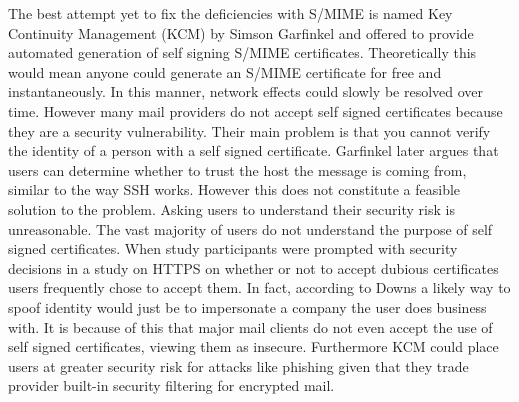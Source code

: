 \documentclass[11pt]{article}
\begin{document}
\par The best attempt yet to fix the deficiencies with S/MIME is named Key Continuity Management (KCM) by Simson Garfinkel and offered to provide automated generation of self signing S/MIME certificates\cite{garfinkel2005johnny}. Theoretically this would mean anyone could generate an S/MIME certificate for free and instantaneously. In this manner, network effects could slowly be resolved over time. However many mail providers do not accept self signed certificates because they are a security vulnerability. Their main problem is that you cannot verify the identity of a person with a self signed certificate. Garfinkel later argues that users can determine whether to trust the host the message is coming from, similar to the way SSH works\cite{garfinkel2005make}. However this does not constitute a feasible solution to the problem. Asking users to understand their security risk is unreasonable. The vast majority of users do not understand the purpose of self signed certificates\cite{downs2006decision}. When study participants were prompted with security decisions in a study on HTTPS on whether or not to accept dubious certificates users frequently chose to accept them\cite{callegati2009man}. In fact, according to Downs a likely way to spoof identity would just be to impersonate a company the user does business with\cite{downs2006decision}. It is because of this that major mail clients do not even accept the use of self signed certificates, viewing them as insecure\cite{force-use-of-self}. Furthermore KCM could place users at greater security risk for attacks like phishing given that they trade provider built-in security filtering for encrypted mail.
\end{document}
